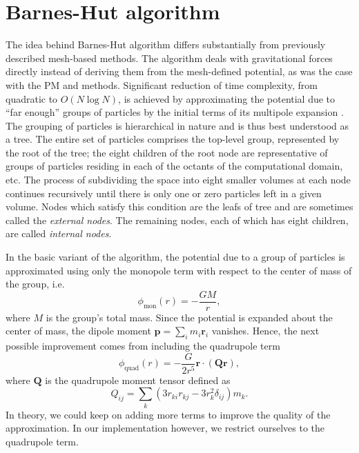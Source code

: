 \chapter{Barnes-Hut algorithm}
The idea behind Barnes-Hut algorithm differs substantially from previously described mesh-based methods.
The algorithm deals with gravitational forces directly instead of deriving them from the mesh-defined potential, as was the case with the PM and \PThreeM{} methods.
Significant reduction of time complexity, from quadratic to $O(N \log N)$, is achieved by approximating the potential due to ``far enough'' groups of particles by the initial terms of its multipole expansion \cite{trenti2008gravitationalnbodysimulations}.
The grouping of particles is hierarchical in nature and is thus best understood as a tree.
The entire set of particles comprises the top-level group, represented by the root of the tree;
the eight children of the root node are representative of groups of particles residing in each of the octants of the computational domain, etc.
The process of subdividing the space into eight smaller volumes at each node continues recursively until there is only one or zero particles left in a given volume.
Nodes which satisfy this condition are the leafs of tree and are sometimes called the \textit{external nodes}.
The remaining nodes, each of which has eight children, are called \textit{internal nodes}.

In the basic variant of the algorithm, the potential due to a group of particles is approximated using only the monopole term with respect to the center of mass of the group, i.e.
\begin{equation*}
    \phi_\text{mon}(r) = -\frac{GM}{r},
\end{equation*}
where $M$ is the group's total mass.
Since the potential is expanded about the center of mass, the dipole moment $\mathbf{p} = \sum_{i} m_i \mathbf{r}_i$ vanishes.
Hence, the next possible improvement comes from including the quadrupole term
\begin{equation*}
    \phi_\text{quad}(r) = -\frac{G}{2r^5} \mathbf{r} \cdot (\mathbf{Q} \mathbf{r}),
\end{equation*}
where $\mathbf{Q}$ is the quadrupole moment tensor defined as
\begin{equation*}
    Q_{ij} = \sum_{k} (3r_{ki}r_{kj} - 3r_k^2\delta_{ij})m_k.
\end{equation*}
In theory, we could keep on adding more terms to improve the quality of the approximation.
In our implementation however, we restrict ourselves to the quadrupole term.




